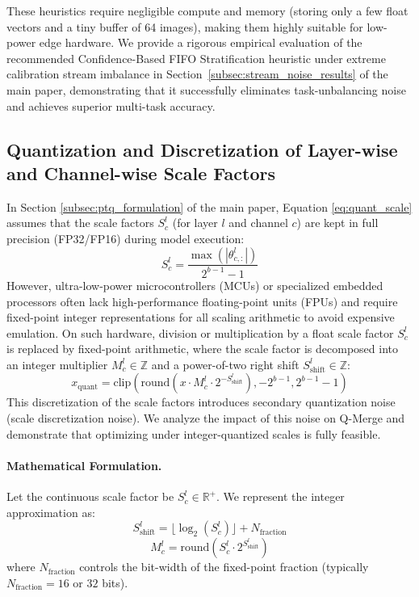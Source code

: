 These heuristics require negligible compute and memory (storing only a few float vectors and a tiny buffer of 64 images), making them highly suitable for low-power edge hardware. We provide a rigorous empirical evaluation of the recommended Confidence-Based FIFO Stratification heuristic under extreme calibration stream imbalance in Section~\ref{subsec:stream_noise_results} of the main paper, demonstrating that it successfully eliminates task-unbalancing noise and achieves superior multi-task accuracy.

\subsection{Quantization and Discretization of Layer-wise and Channel-wise Scale Factors}
\label{subsec:scale_factor_quant}

In Section \ref{subsec:ptq_formulation} of the main paper, Equation \ref{eq:quant_scale} assumes that the scale factors $S^l_c$ (for layer $l$ and channel $c$) are kept in full precision (FP32/FP16) during model execution:
\begin{equation}
    S^l_c = \frac{\max(|\theta^l_{c, :}|)}{2^{b-1} - 1}
\end{equation}
However, ultra-low-power microcontrollers (MCUs) or specialized embedded processors often lack high-performance floating-point units (FPUs) and require fixed-point integer representations for all scaling arithmetic to avoid expensive emulation. On such hardware, division or multiplication by a float scale factor $S^l_c$ is replaced by fixed-point arithmetic, where the scale factor is decomposed into an integer multiplier $M^l_c \in \mathbb{Z}$ and a power-of-two right shift $S^l_{\text{shift}} \in \mathbb{Z}$:
\begin{equation}
    x_{\text{quant}} = \text{clip}\left( \text{round}\left( x \cdot M^l_c \cdot 2^{-S^l_{\text{shift}}} \right), -2^{b-1}, 2^{b-1}-1 \right)
\end{equation}
This discretization of the scale factors introduces secondary quantization noise (scale discretization noise). We analyze the impact of this noise on Q-Merge and demonstrate that optimizing under integer-quantized scales is fully feasible.

\paragraph{Mathematical Formulation.}
Let the continuous scale factor be $S^l_c \in \mathbb{R}^+$. We represent the integer approximation as:
\begin{equation}
    S^l_{\text{shift}} = \lfloor \log_2(S^l_c) \rfloor + N_{\text{fraction}}
\end{equation}
\begin{equation}
    M^l_c = \text{round}\left( S^l_c \cdot 2^{S^l_{\text{shift}}} \right)
\end{equation}
where $N_{\text{fraction}}$ controls the bit-width of the fixed-point fraction (typically $N_{\text{fraction}} = 16$ or $32$ bits).

